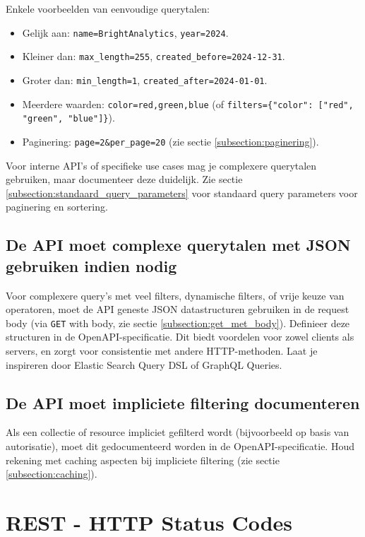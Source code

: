 Enkele voorbeelden van eenvoudige querytalen:

\begin{itemize}
    \item Gelijk aan: \texttt{name=BrightAnalytics}, \texttt{year=2024}.
    \item Kleiner dan: \texttt{max\_length=255}, \texttt{created\_before=2024-12-31}.
    \item Groter dan: \texttt{min\_length=1}, \texttt{created\_after=2024-01-01}.
    \item Meerdere waarden: \texttt{color=red,green,blue} (of \texttt{filters=\{"color": ["red", "green", "blue"]\}}).
    \item Paginering: \texttt{page=2\&per\_page=20} (zie sectie \ref{subsection:paginering}).
\end{itemize}

Voor interne API's of specifieke use cases mag je complexere querytalen gebruiken, maar documenteer deze duidelijk. Zie sectie \ref{subsection:standaard_query_parameters} voor standaard query parameters voor paginering en sortering.

\subsection{De API moet complexe querytalen met JSON gebruiken indien nodig}
\label{subsection:complexe_querytalen}

Voor complexere query's met veel filters, dynamische filters, of vrije keuze van operatoren, moet de API geneste JSON datastructuren gebruiken in de request body (via \texttt{GET} with body, zie sectie \ref{subsection:get_met_body}). Definieer deze structuren in de OpenAPI-specificatie. Dit biedt voordelen voor zowel clients als servers, en zorgt voor consistentie met andere HTTP-methoden. Laat je inspireren door Elastic Search Query DSL of GraphQL Queries.

\subsection{De API moet impliciete filtering documenteren}
\label{subsection:impliciete_filtering}

Als een collectie of resource impliciet gefilterd wordt (bijvoorbeeld op basis van autorisatie), moet dit gedocumenteerd worden in de OpenAPI-specificatie. Houd rekening met caching aspecten bij impliciete filtering (zie sectie \ref{subsection:caching}).

\section{REST - HTTP Status Codes}

